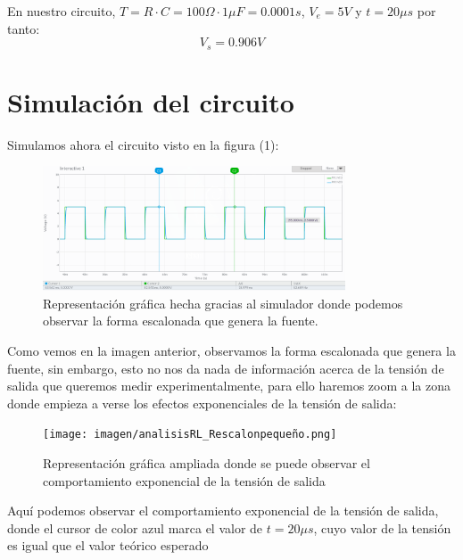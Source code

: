 \documentclass[11pt,letterpaper]{article}
\begin{document}
En nuestro circuito, $T=R\cdot C=100 \Omega \cdot 1 \mu F= 0.0001 s$, $V_e= 5 V$ y $t=20\mu s$ por tanto:
\begin{equation}
	\boxed{V_s=0.906V}
\end{equation}
\section{Simulación del circuito}%
\label{sec:Simulación del circuito}
Simulamos ahora el circuito visto en la figura (1):
\begin{figure}[H]
	\centering
	\includegraphics[width=0.8\textwidth]{imagen/analisisRL_R_escalongrande.png}
	\caption{Representación gráfica hecha gracias al simulador donde podemos observar la forma escalonada que genera la fuente.}
	\label{fig:imagen-analisisRL_R_escalongrande-png}
\end{figure}
Como vemos en la imagen anterior, observamos la forma escalonada que genera la fuente, sin embargo, esto no nos da nada de información acerca de la tensión de salida que queremos medir experimentalmente, para ello haremos zoom a la zona donde empieza a verse los efectos exponenciales de la tensión de salida:
\begin{figure}[H]
	\centering
	\texttt{[image: imagen/analisisRL\_Rescalonpequeño.png]}
	\caption{Representación gráfica ampliada donde se puede observar el comportamiento exponencial de la tensión de salida}
	\label{fig:imagen-analisisRL_Rescalonpeque-png}
\end{figure}
Aquí podemos observar el comportamiento exponencial de la tensión de salida, donde el cursor de color azul marca el valor de $t=20\mu s$, cuyo valor de la tensión es igual que el valor teórico esperado
\end{document}
